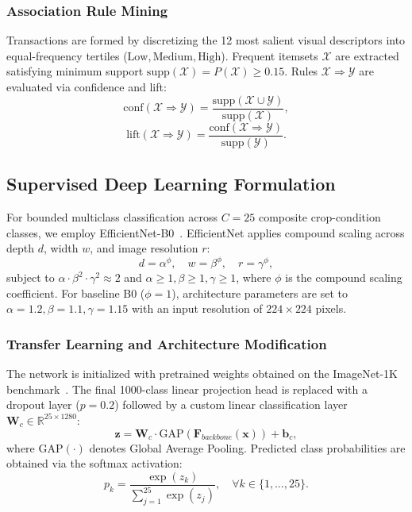 \documentclass[conference]{IEEEtran}
\begin{document}
\subsubsection{Association Rule Mining}
Transactions are formed by discretizing the 12 most salient visual descriptors into equal-frequency tertiles ($\text{Low}, \text{Medium}, \text{High}$). Frequent itemsets $\mathcal{X}$ are extracted satisfying minimum support $\text{supp}(\mathcal{X}) = P(\mathcal{X}) \ge 0.15$. Rules $\mathcal{X} \Rightarrow \mathcal{Y}$ are evaluated via confidence and lift:
\begin{equation}
\text{conf}(\mathcal{X} \Rightarrow \mathcal{Y}) = \frac{\text{supp}(\mathcal{X} \cup \mathcal{Y})}{\text{supp}(\mathcal{X})},
\end{equation}
\begin{equation}
\text{lift}(\mathcal{X} \Rightarrow \mathcal{Y}) = \frac{\text{conf}(\mathcal{X} \Rightarrow \mathcal{Y})}{\text{supp}(\mathcal{Y})}.
\end{equation}

\subsection{Supervised Deep Learning Formulation}
For bounded multiclass classification across $C=25$ composite crop-condition classes, we employ EfficientNet-B0~\cite{tan2019efficientnet}. EfficientNet applies compound scaling across depth $d$, width $w$, and image resolution $r$:
\begin{equation}
d = \alpha^\phi, \quad w = \beta^\phi, \quad r = \gamma^\phi,
\end{equation}
subject to $\alpha \cdot \beta^2 \cdot \gamma^2 \approx 2$ and $\alpha \ge 1, \beta \ge 1, \gamma \ge 1$, where $\phi$ is the compound scaling coefficient. For baseline B0 ($\phi=1$), architecture parameters are set to $\alpha=1.2, \beta=1.1, \gamma=1.15$ with an input resolution of $224\times 224$ pixels.

\subsubsection{Transfer Learning and Architecture Modification}
The network is initialized with pretrained weights obtained on the ImageNet-1K benchmark~\cite{deng2009imagenet}. The final 1000-class linear projection head is replaced with a dropout layer ($p=0.2$) followed by a custom linear classification layer $\mathbf{W}_c \in \mathbb{R}^{25 \times 1280}$:
\begin{equation}
\mathbf{z} = \mathbf{W}_c \cdot \text{GAP}(\mathbf{F}_{backbone}(\mathbf{x})) + \mathbf{b}_c,
\end{equation}
where $\text{GAP}(\cdot)$ denotes Global Average Pooling. Predicted class probabilities are obtained via the softmax activation:
\begin{equation}
p_k = \frac{\exp(z_k)}{\sum_{j=1}^{25} \exp(z_j)}, \quad \forall k \in \{1, \dots, 25\}.
\end{equation}
\end{document}
